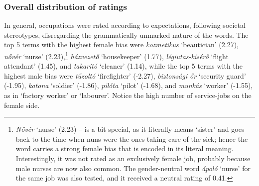 \documentclass[10pt, a4paper]{article}
\begin{document}

\subsubsection{Overall distribution of ratings}

In general, occupations were rated according to expectations, following societal stereotypes, disregarding the grammatically unmarked nature of the words. The top 5 terms with the highest female bias were \textit{kozmetikus} `beautician' (2.27), \textit{nővér} `nurse' (2.23),\footnote{\textit{Nővér} `nurse' (2.23) -- is a bit special, as it literally means `sister' and goes back to the time when nuns were the ones taking care of the sick; hence the word carries a strong female bias that is encoded in its literal meaning. Interestingly, it was not rated as an exclusively female job, probably because male nurses are now also common. The gender-neutral word \textit{ápoló} `nurse' for the same job was also tested, and it received a neutral rating of 0.41.} \textit{házvezető} `housekeeper' (1.77), \textit{légiutas-kísérő} `flight attendant' (1.45), and \textit{takarító} `cleaner' (1.14), while the top 5 terms with the highest male bias were \textit{tűzoltó} `firefighter' (-2.27), \textit{biztonsági őr} `security guard' (-1.95), \textit{katona} `soldier' (-1.86), \textit{pilóta} `pilot' (-1.68), and \textit{munkás} `worker' (-1.55), as in `factory worker' or `labourer'. Notice the high number of service-jobs on the female side.


\end{document}
